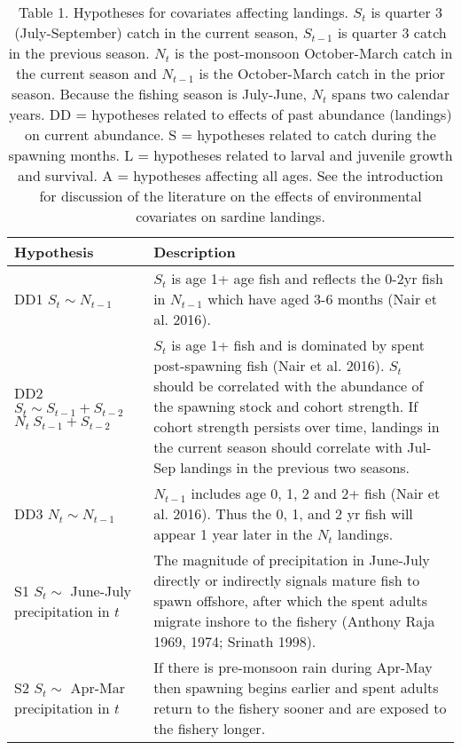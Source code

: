 
\begin{table}

\caption{\label{tab:print-table-hyp}Table 1. Hypotheses for covariates affecting landings.  $S_t$ is quarter 3 (July-September) catch in the current season, $S_{t-1}$ is quarter 3 catch in the previous season. $N_t$ is the post-monsoon October-March catch in the current season and $N_{t-1}$ is the October-March catch in the prior season. Because the fishing season is July-June, $N_t$ spans two calendar years. DD = hypotheses related to effects of past abundance (landings) on current abundance. S = hypotheses related to catch during the spawning months. L = hypotheses related to larval and juvenile growth and survival. A = hypotheses affecting all ages. See the introduction for discussion of the literature on the effects of environmental covariates on sardine landings.}
\centering
\begin{tabular}[t]{>{\raggedright\arraybackslash}p{5.5cm}|>{\raggedright\arraybackslash}p{10cm}}
\hline
Hypothesis & Description\\
\hline
DD1 \newline $S_t \sim N_{t-1}$ & $S_t$ is age 1+ age fish and reflects the 0-2yr fish in $N_{t-1}$ which have aged 3-6 months (Nair et al. 2016).\\
\hline
DD2 \newline $S_t \sim S_{t-1} + S_{t-2}$ 
 $N_t ~ S_{t-1} + S_{t-2}$ & $S_t$ is age 1+ fish and is dominated by spent post-spawning fish (Nair et al. 2016). $S_t$ should be correlated with the abundance of the spawning stock and cohort strength. If cohort strength persists over time, landings in the current season should correlate with Jul-Sep landings in the previous two seasons.\\
\hline
DD3 \newline $N_t \sim N_{t-1}$ & $N_{t-1}$ includes age 0, 1, 2 and 2+ fish (Nair et al. 2016). Thus the 0, 1, and 2 yr fish will appear 1 year later in the $N_t$ landings.\\
\hline
S1 \newline $S_t \sim$ June-July precipitation in $t$ & The magnitude of precipitation in June-July directly or indirectly signals mature fish to spawn offshore, after which the spent adults migrate inshore to the fishery (Anthony Raja 1969, 1974; Srinath 1998).\\
\hline
S2 \newline $S_t \sim$ Apr-Mar precipitation in $t$ & If there is pre-monsoon rain during Apr-May then spawning begins earlier and spent adults return to the fishery sooner and are exposed to the fishery longer.\\

\end{tabular}
\end{table}
